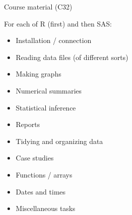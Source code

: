 \documentclass[ignorenonframetext,]{beamer}
\providecommand{\tightlist}{%
  \setlength{\itemsep}{0pt}\setlength{\parskip}{0pt}}
\begin{document}
\begin{frame}{Course material (C32)}
\protect\hypertarget{course-material-c32}{}

For each of R (first) and then SAS:

\begin{itemize}
\tightlist
\item
  Installation / connection
\item
  Reading data files (of different sorts)
\item
  Making graphs
\item
  Numerical summaries
\item
  Statistical inference
\item
  Reports
\item
  Tidying and organizing data
\item
  Case studies
\item
  Functions / arrays
\item
  Dates and times
\item
  Miscellaneous tasks
\end{itemize}

\end{frame}
\end{document}
